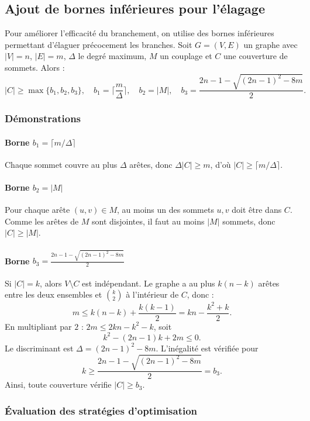 \documentclass[11pt,a4paper]{article}
\begin{document}
\subsection{Ajout de bornes inférieures pour l'élagage}

Pour améliorer l'efficacité du branchement, on utilise des bornes inférieures permettant d'élaguer précocement les branches. Soit $G=(V,E)$ un graphe avec $|V|=n$, $|E|=m$, $\Delta$ le degré maximum, $M$ un couplage et $C$ une couverture de sommets. Alors :
\[
|C|\ge \max\{b_1,b_2,b_3\},\quad 
b_1=\Big\lceil\frac{m}{\Delta}\Big\rceil,\quad 
b_2=|M|,\quad 
b_3=\frac{2n-1-\sqrt{(2n-1)^2-8m}}{2}.
\]

\subsubsection{Démonstrations}

\paragraph{Borne $b_1=\lceil m/\Delta\rceil$}
Chaque sommet couvre au plus $\Delta$ arêtes, donc $\Delta|C|\ge m$, d'où $|C|\ge \lceil m/\Delta\rceil$.

\paragraph{Borne $b_2=|M|$}
Pour chaque arête $(u,v)\in M$, au moins un des sommets $u,v$ doit être dans $C$. Comme les arêtes de $M$ sont disjointes, il faut au moins $|M|$ sommets, donc $|C|\ge |M|$.

\paragraph{Borne $b_3=\frac{2n-1-\sqrt{(2n-1)^2-8m}}{2}$}
Si $|C|=k$, alors $V\setminus C$ est indépendant. Le graphe a au plus $k(n-k)$ arêtes entre les deux ensembles et $\binom{k}{2}$ à l’intérieur de $C$, donc :
\[
m\le k(n-k)+\frac{k(k-1)}{2}=kn-\frac{k^2+k}{2}.
\]
En multipliant par $2$ : $2m\le 2kn-k^2-k$, soit
\[
k^2-(2n-1)k+2m\le0.
\]
Le discriminant est $\Delta=(2n-1)^2-8m$. L’inégalité est vérifiée pour
\[
k\ge\frac{2n-1-\sqrt{(2n-1)^2-8m}}{2}=b_3.
\]
Ainsi, toute couverture vérifie $|C|\ge b_3$.

\subsubsection{Évaluation des stratégies d'optimisation}
\end{document}

